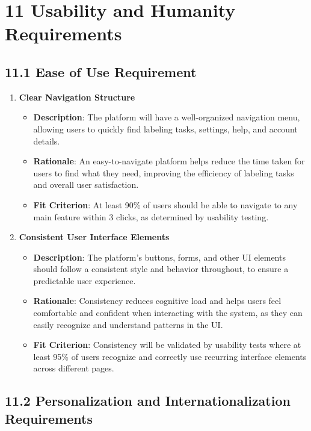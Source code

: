 \documentclass[12pt]{article}
\begin{document}
\section*{11 Usability and Humanity Requirements}

\subsection*{11.1 Ease of Use Requirement}


\begin{enumerate}
    \item \textbf{Clear Navigation Structure}  
        \begin{itemize}
            \item \textbf{Description}: The platform will have a well-organized navigation menu, allowing users to quickly find labeling tasks, settings, help, and account details.  
            \item \textbf{Rationale}: An easy-to-navigate platform helps reduce the time taken for users to find what they need, improving the efficiency of labeling tasks and overall user satisfaction.  
            \item \textbf{Fit Criterion}: At least 90\% of users should be able to navigate to any main feature within 3 clicks, as determined by usability testing.
        \end{itemize}
    \item \textbf{Consistent User Interface Elements}  
        \begin{itemize}
            \item \textbf{Description}: The platform’s buttons, forms, and other UI elements should follow a consistent style and behavior throughout, to ensure a predictable user experience.  
            \item \textbf{Rationale}: Consistency reduces cognitive load and helps users feel comfortable and confident when interacting with the system, as they can easily recognize and understand patterns in the UI.  
            \item \textbf{Fit Criterion}: Consistency will be validated by usability tests where at least 95\% of users recognize and correctly use recurring interface elements across different pages.
        \end{itemize}
\end{enumerate}

\subsection*{11.2 Personalization and Internationalization Requirements}
\end{document}
